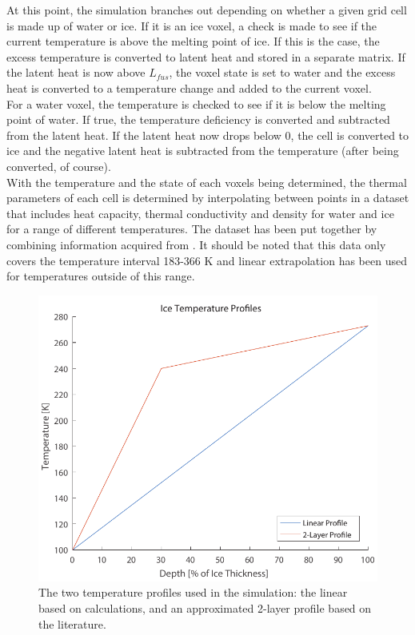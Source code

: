 \noindent
At this point, the simulation branches out depending on whether a given grid cell is made up of water or ice. If it is an ice voxel, a check is made to see if the current temperature is above the melting point of ice. If this is the case, the excess temperature is converted to latent heat and stored in a separate matrix. If the latent heat is now above $L_{fus}$, the voxel state is set to water and the excess heat is converted to a temperature change and added to the current voxel.\\

\noindent
For a water voxel, the temperature is checked to see if it is below the melting point of water. If true, the temperature deficiency is converted and subtracted from the latent heat. If the latent heat now drops below 0, the cell is converted to ice and the negative latent heat is subtracted from the temperature (after being converted, of course).\\

\noindent
With the temperature and the state of each voxels being determined, the thermal parameters of each cell is determined by interpolating between points in a dataset that includes heat capacity, thermal conductivity and density for water and ice for a range of different temperatures. The dataset has been put together by combining information acquired from \cite{website:engineeringToolbox}. It should be noted that this data only covers the temperature interval 183-366 K and linear extrapolation has been used for temperatures outside of this range.\\

\begin{figure}[ht]
	\centering
	\includegraphics[width=.5\textwidth]{figures/LAMC/iceTempProfiles.pdf}
	\caption{The two temperature profiles used in the simulation: the linear based on calculations, and an approximated 2-layer profile based on the literature.}
	\label{fig:iceTempProfiles}
\end{figure}

